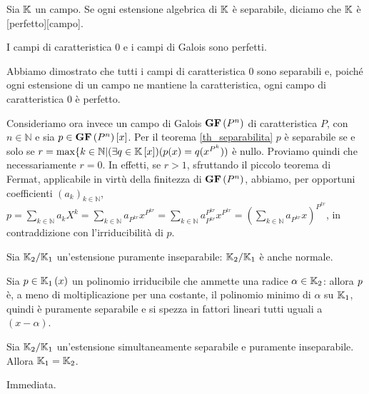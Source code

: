 \begin{Definition}
	Sia $\mathbb{K}$ un campo. Se ogni estensione algebrica di $\mathbb{K}$ \`e separabile, diciamo che $\mathbb{K}$ \`e [perfetto][campo].
\end{Definition}
\begin{Theorem}
	I campi di caratteristica $0$ e i campi di Galois sono perfetti.
\end{Theorem}
\Proof Abbiamo dimostrato che tutti i campi di caratteristica $0$ sono separabili e, poich\'e ogni estensione di un campo ne mantiene la caratteristica, ogni campo di caratteristica $0$ \`e perfetto.
\par Consideriamo ora invece un campo di Galois $\textbf{GF} \left ( P^n \right )$ di caratteristica $P$, con $n \in \mathbb{N}$ e sia $p \in \textbf{GF} \left ( P^n \right ) \left [ x \right ]$. Per il teorema \ref{th_separabilita} $p$ \`e separabile se e solo se $r = \max \lbrace k \in \mathbb{N} | (\exists q \in \mathbb{K} \left [ x \right ])(p(x) = q(x^{P^k}))$ \`e nullo. Proviamo quindi che necessariamente $r = 0$. In effetti, se $r > 1$, sfruttando il piccolo teorema di Fermat, applicabile in virt\`u della finitezza di $\textbf{GF} \left ( P^n \right )$, abbiamo, per opportuni coefficienti $(a_k)_{k \in \mathbb{N}}$, $p = \sum_{k \in \mathbb{N}} a_kX^k = \sum_{k \in \mathbb{N}} a_{P^{kr}} x^{P^{kr}} = \sum_{k \in \mathbb{N}} a_{P^{kr}}^{P^{kr}} x^{P^{kr}} = \left ( \sum_{k \in \mathbb{N}} a_{P^{kr}}x \right )^{P^{kr}}$, in contraddizione con l'irriducibilit\`a di $p$. \EndProof
\begin{Theorem}
	Sia $\mathbb{K}_2/\mathbb{K}_1$ un'estensione puramente inseparabile: $\mathbb{K}_2/\mathbb{K}_1$ \`e anche normale.
\end{Theorem}
\Proof Sia $p \in \mathbb{K}_1 \left ( x \right )$ un polinomio irriducibile che ammette una radice $\alpha \in \mathbb{K}_2$: allora $p$ \`e, a meno di moltiplicazione per una costante, il polinomio minimo di $\alpha$ su $\mathbb{K}_1$, quindi \`e puramente separabile e si spezza in fattori lineari tutti uguali a $(x - \alpha)$. \EndProof
\begin{Theorem}
	Sia $\mathbb{K}_2/\mathbb{K}_1$ un'estensione simultaneamente separabile e puramente inseparabile. Allora $\mathbb{K}_1 = \mathbb{K}_2$.
\end{Theorem}
\Proof Immediata. \EndProof
